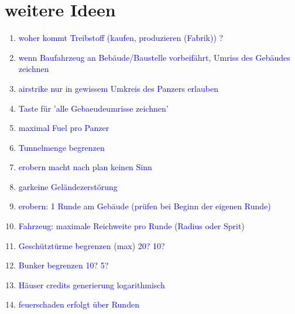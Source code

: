 \documentclass[10pt,a4paper,final]{scrartcl}
\newcommand{\notiz}[1]{\textcolor{blue}{#1}}
\begin{document}
\section{weitere Ideen}
\begin{enumerate}
\item \notiz{woher kommt Treibstoff (kaufen, produzieren (Fabrik)) ?}
\item \notiz{wenn Baufahrzeug an Bebäude/Baustelle vorbeifährt, Umriss des Gebäudes zeichnen}
\item \notiz{airstrike nur in gewissem Umkreis des Panzers erlauben}
\item \notiz{Taste für 'alle Gebaeudeumrisse zeichnen'}
\item \notiz{maximal Fuel pro Panzer}
\item \notiz{Tunnelmenge begrenzen}
\item \notiz{erobern macht nach plan keinen Sinn}
\item \notiz{garkeine Geländezerstörung}
\item \notiz{erobern: 1 Runde am Gebäude (prüfen bei Beginn der eigenen Runde)}
\item \notiz{Fahrzeug: maximale Reichweite pro Runde (Radius oder Sprit)}

\item \notiz{Geschütztürme begrenzen (max) 20? 10?}
\item \notiz{Bunker begrenzen 10? 5?}
\item \notiz{Häuser credits generierung logarithmisch}
\item \notiz{feuerschaden erfolgt über Runden}
\end{enumerate}
\end{document}
